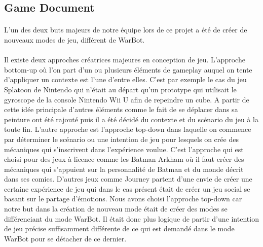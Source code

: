 \documentclass{report}
\begin{document}
\subsection{Game Document}
\paragraph{}
  L’un des deux buts majeurs de notre équipe lors de ce projet a été de créer de nouveaux modes de jeu, différent de WarBot.
\paragraph{}
  Il existe deux approches créatrices majeures en conception de jeu. L’approche bottom-up où l’on part d’un ou plusieurs éléments de gameplay auquel on tente d’appliquer un contexte est l'une d'entre elles. C’est par exemple le cas du jeu Splatoon de Nintendo qui n’était au départ qu’un prototype qui utilisait le gyroscope de la console Nintendo Wii U afin de repeindre un cube. A partir de cette idée principale d’autres éléments comme le fait de se déplacer dans sa peinture ont été rajouté puis il a été décidé du contexte et du scénario du jeu à la toute fin. \newline
L’autre approche est l’approche top-down dans laquelle on commence par déterminer le scénario ou une intention de jeu pour lesquels on crée des mécaniques qui s’inscrivent dans l’expérience voulue. C’est l’approche qui est choisi pour des jeux à licence comme les Batman Arkham où il faut créer des mécaniques qui s’appuient sur la personnalité de Batman et du monde décrit dans ses comics. D’autres jeux comme Journey partent d’une envie de créer une certaine expérience de jeu qui dans le cas présent était de créer un jeu social se basant sur le partage d’émotions. \newline
Nous avons choisi l’approche top-down car notre but dans la création de nouveau mode était de créer des modes se différenciant du mode WarBot. Il était donc plus logique de partir d’une intention de jeu précise suffisamment différente de ce qui est demandé dans le mode WarBot pour se détacher de ce dernier.
\paragraph{}
\end{document}

